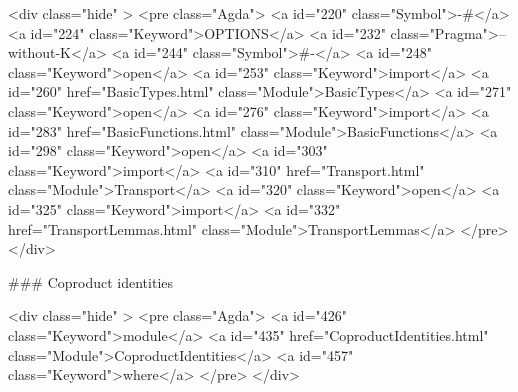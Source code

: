   <div class="hide" >
<pre class="Agda">
<a id="220" class="Symbol">{-#</a> <a id="224" class="Keyword">OPTIONS</a> <a id="232" class="Pragma">--without-K</a> <a id="244" class="Symbol">#-}</a>
<a id="248" class="Keyword">open</a> <a id="253" class="Keyword">import</a> <a id="260" href="BasicTypes.html" class="Module">BasicTypes</a>
<a id="271" class="Keyword">open</a> <a id="276" class="Keyword">import</a> <a id="283" href="BasicFunctions.html" class="Module">BasicFunctions</a>
<a id="298" class="Keyword">open</a> <a id="303" class="Keyword">import</a> <a id="310" href="Transport.html" class="Module">Transport</a>
<a id="320" class="Keyword">open</a> <a id="325" class="Keyword">import</a> <a id="332" href="TransportLemmas.html" class="Module">TransportLemmas</a>
</pre>
</div>

### Coproduct identities

<div class="hide" >
<pre class="Agda">
<a id="426" class="Keyword">module</a>
  <a id="435" href="CoproductIdentities.html" class="Module">CoproductIdentities</a>
  <a id="457" class="Keyword">where</a>
</pre>
</div>

